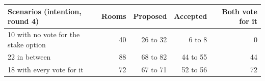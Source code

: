 \begin{tabular}{@{}lrrrr@{}}
\toprule
Scenarios (intention, round 4) & Rooms & Proposed & Accepted & Both vote for it \\
\midrule
10 with no vote for the stake option & 40 & 26 to 32 & 6 to 8 & 0 \\
22 in between & 88 & 68 to 82 & 44 to 55 & 44 \\
18 with every vote for it & 72 & 67 to 71 & 52 to 56 & 72 \\
\bottomrule
\end{tabular}
